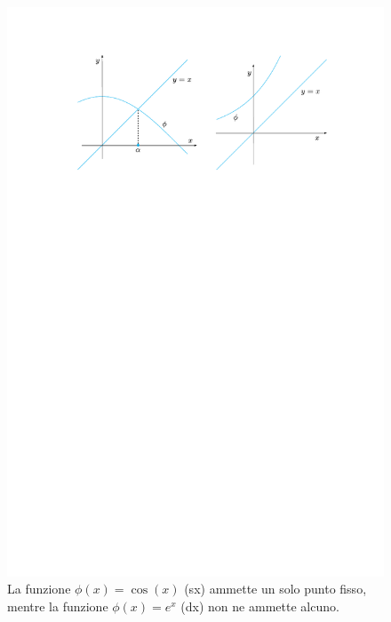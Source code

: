 \begin{figure}[!htp]
    \centering
    \includegraphics[width=\textwidth]{img/iterazioni-di-punto-fisso-1.pdf}
    \caption{La funzione $\phi\left(x\right) = \cos\left(x\right)$ (sx) ammette un solo punto fisso, mentre la funzione $\phi\left(x\right) = e^{x}$ (dx) non ne ammette alcuno.}
    \label{fig: non tutte le funzioni hanno un punto fisso}
\end{figure}

